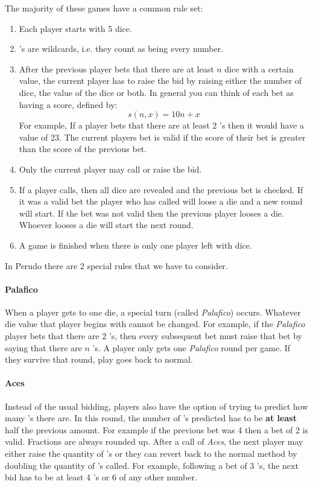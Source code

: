 The majority of these games have a common rule set:
\begin{enumerate}
    \item Each player starts with 5 dice.
    \item {\large{}}'s are wildcards, i.e. they count as being every number.
    \item After the previous player bets that there are at least $n$ dice with a certain value, the current player has to raise the bid by raising either the number of dice, the value of the dice or both. In general you can think of each bet as having a score, defined by:
    \begin{equation}
        \label{eq:score}
        s(n, x) = 10n + x
    \end{equation}
    For example, If a player bets that there are at least 2 {\large{}}'s then it would have a value of 23. The current players bet is valid if the score of their bet is greater than the score of the previous bet.
    \item Only the current player may call or raise the bid.
    \item If a player calls, then all dice are revealed and the previous bet is checked. If it was a valid bet the player who has called will loose a die and a new round will start. If the bet was not valid then the previous player looses a die. Whoever looses a die will start the next round.\label{list:call}
    \item A game is finished when there is only one player left with dice.
\end{enumerate}

In Perudo there are 2 special rules that we have to consider.
\paragraph{Palafico}
When a player gets to one die, a special turn (called \textit{Palafico}) occurs. Whatever die value that player begins with cannot be changed. For example, if the \textit{Palafico} player bets that there are 2 {\large{}}'s, then every subsequent bet must raise that bet by saying that there are $n$ {\large{}}'s. A player only gets one \textit{Palafico} round per game. If they survive that round, play goes back to normal.

\paragraph{Aces}
Instead of the usual bidding, players also have the option of trying to predict how many {\large{}}'s there are. In this round, the number of {\large{}}'s predicted has to be \textbf{at least} half the previous amount. For example if the previous bet was 4 {\large{}} then a bet of 2 {\large{}} is valid. Fractions are always rounded up. After a call of \textit{Aces}, the next player may either raise the quantity of {\large{}}'s or they can revert back to the normal method by doubling the quantity of {\large{}}'s called. For example, following a bet of 3 {\large{}}'s, the next bid has to be at least 4 {\large{}}'s or 6 of any other number.

